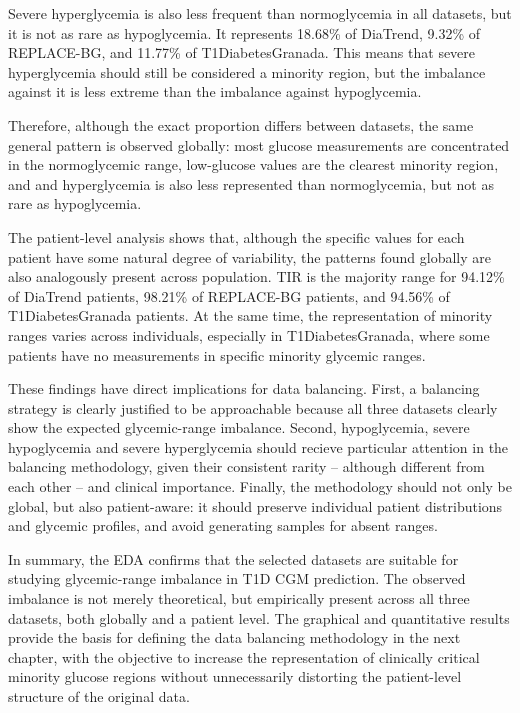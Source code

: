 Severe hyperglycemia is also less frequent than normoglycemia in all datasets, but it is not as rare as hypoglycemia. It represents 18.68\% of DiaTrend, 9.32\% of REPLACE-BG, and 11.77\% of T1DiabetesGranada. This means that severe hyperglycemia should still be considered a minority region, but the imbalance against it is less extreme than the imbalance against hypoglycemia.

Therefore, although the exact proportion differs between datasets, the same general pattern is observed globally: most glucose measurements are concentrated in the normoglycemic range, low-glucose values are the clearest minority region, and and hyperglycemia is also less represented than normoglycemia, but not as rare as hypoglycemia.

The patient-level analysis shows that, although the specific values for each patient have some natural degree of variability, the patterns found globally are also analogously present across population. TIR is the majority range for 94.12\% of DiaTrend patients, 98.21\% of REPLACE-BG patients, and 94.56\% of T1DiabetesGranada patients. At the same time, the representation of minority ranges varies across individuals, especially in T1DiabetesGranada, where some patients have no measurements in specific minority glycemic ranges.

These findings have direct implications for data balancing. First, a balancing strategy is clearly justified to be approachable because all three datasets clearly show the expected glycemic-range imbalance. Second, hypoglycemia, severe hypoglycemia and severe hyperglycemia should recieve particular attention in the balancing methodology, given their consistent rarity -- although different from each other -- and clinical importance. Finally, the methodology should not only be global, but also patient-aware: it should preserve individual patient distributions and glycemic profiles, and avoid generating samples for absent ranges.

In summary, the EDA confirms that the selected datasets are suitable for studying glycemic-range imbalance in T1D CGM prediction. The observed imbalance is not merely theoretical, but empirically present across all three datasets, both globally and a patient level. The graphical and quantitative results provide the basis for defining the data balancing methodology in the next chapter, with the objective to increase the representation of clinically critical minority glucose regions without unnecessarily distorting the patient-level structure of the original data.